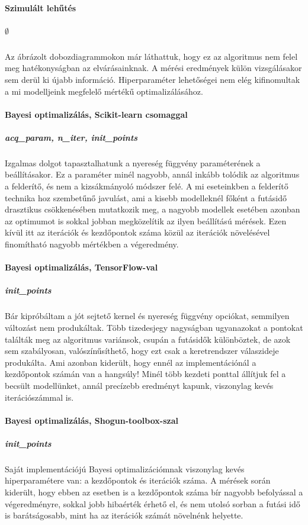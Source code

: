 \paragraph{Szimulált lehűtés}\subparagraph{$\emptyset$} Az  ábrázolt dobozdiagrammokon már láthattuk, hogy ez az algoritmus nem felel meg hatékonyságban az elvárásainknak. A mérési eredmények külön vizsgálásakor sem derül ki újabb információ. Hiperparaméter lehetőségei nem elég kifinomultak a mi modelljeink megfelelő mértékű optimalizálásához.
\paragraph{Bayesi optimalizálás, Scikit-learn csomaggal}\subparagraph{acq\_param, n\_iter, init\_points} Izgalmas dolgot tapasztalhatunk a nyereség függvény paraméterének a beállításakor. Ez a paraméter minél nagyobb, annál inkább tolódik az algoritmus a felderítő, és nem a kizsákmányoló módszer felé. A mi eseteinkben a felderítő technika hoz szembetűnő javulást, ami a kisebb modelleknél főként a futásidő drasztikus csökkenésében mutatkozik meg, a nagyobb modellek esetében azonban az optimumot is sokkal jobban megközelítik az ilyen beállítású mérések. Ezen kívül itt az iterációk és kezdőpontok száma közül az iterációk növelésével finomítható nagyobb mértékben a végeredmény.
\paragraph{Bayesi optimalizálás, TensorFlow-val}\subparagraph{init\_points} Bár kipróbáltam a jót sejtető kernel és nyereség függvény opciókat, semmilyen változást nem produkáltak. Több tizedesjegy nagyságban ugyanazokat a pontokat találták meg az algoritmus variánsok, csupán a futásidők különböztek, de azok sem szabályosan, valószínűsíthető, hogy ezt csak a keretrendszer válaszideje produkálta. Ami azonban kiderült, hogy ennél az implementációnál a kezdőpontok számán van a hangsúly! Minél több kezdeti ponttal állítjuk fel a becsült modellünket, annál precízebb eredményt kapunk, viszonylag kevés iterációszámmal is.
\paragraph{Bayesi optimalizálás, Shogun-toolbox-szal}\subparagraph{init\_points} Saját implementációjú Bayesi optimalizációmnak viszonylag kevés hiperparamétere van: a kezdőpontok és iterációk száma. A mérések során kiderült, hogy ebben az esetben is a kezdőpontok száma bír nagyobb befolyással a végeredményre, sokkal jobb hibaérték érhető el, és nem utolsó sorban a futási idő is barátságosabb, mint ha az iterációk számát növelnénk helyette.


